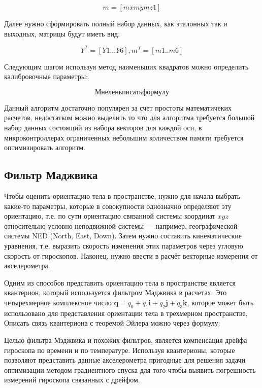 $$ m = [mx my mz 1]$$

Далее нужно сформировать полный набор данных, как эталонных так и выходных, матрицы будут иметь вид:

$$ 
Y^T = [Y1...Y6],
m^T = [m1..m6]
$$

Следующим шагом используя метод наименьших квадратов можно определить калибровочные параметры:

$$  Мне лень писать формулу $$

Данный алгоритм достаточно популярен за счет простоты математичеких расчетов, недостатком можно выделить то что 
для алгоритма требуется большой набор данных состоящий из набора векторов для каждой оси, в микроконтроллерах ограниченных небольшим 
количеством памяти требуется оптимизировать алгоритм. 

\subsection{Фильтр Маджвика}

Чтобы оценить ориентацию тела в пространстве, нужно для начала выбрать какие-то параметры, 
которые в совокупности однозначно определяют эту ориентацию, т.е. по сути ориентацию связанной 
системы координат $xyz$ относительно условно неподвижной системы — например, географической системы NED (North, East, Down). 
Затем нужно составить кинематические уравнения, т.е. выразить скорость изменения этих параметров через угловую скорость от 
гироскопов. Наконец, нужно ввести в расчёт векторные измерения от акселерометра.

Одним из способов представить ориентацию тела в пространстве является квантерион, который используется фильтром Маджвика в расчетах.
Это четырехмерное комплексное число $\mathbf{q}=q_{0}+q_{1}\mathbf{i}+q_{2}\mathbf{j}+q_{3}\mathbf{k}$, которое может быть использовано 
для представления ориентации тела в трехмерном пространстве,
Описать связь квантериона с теоремой Эйлера можно через формулу: 


Целью фильтра Мэджвика и похожих фильтров, является компенсация дрейфа гироскопа по времени и по температуре.
Используя квантерионы, которые позволяют представить данные акселерометра пригодные для решения задачи оптимизации 
методом градиентного спуска для того чтобы выявить погрешность измерений гироскопа связанных с дрейфом.

